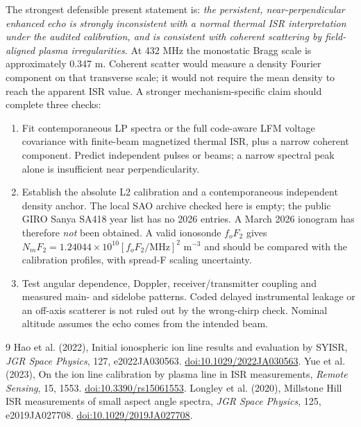 \documentclass[11pt,a4paper]{article}
\begin{document}
The strongest defensible present statement is: \emph{the persistent,
near-perpendicular enhanced echo is strongly inconsistent with a normal
thermal ISR interpretation under the audited calibration, and is consistent
with coherent scattering by field-aligned plasma irregularities.}
At 432 MHz the monostatic Bragg scale is approximately 0.347 m. Coherent
scatter would measure a density Fourier component on that transverse scale;
it would not require the mean density to reach the apparent ISR value.
A stronger mechanism-specific claim should complete three checks:
\begin{enumerate}
\item Fit contemporaneous LP spectra or the full code-aware LFM voltage
covariance with finite-beam magnetized thermal ISR, plus a narrow coherent
component. Predict independent pulses or beams; a narrow spectral peak alone
is insufficient near perpendicularity.
\item Establish the absolute L2 calibration and a contemporaneous independent
density anchor. The local SAO archive checked here is empty; the public GIRO
Sanya SA418 year list has no 2026 entries. A March 2026 ionogram has therefore
\emph{not} been obtained. A valid ionosonde $f_oF_2$ gives
$N_mF_2=1.24044\times10^{10}[f_oF_2/\mathrm{MHz}]^2$ m$^{-3}$ and should be
compared with the calibration profiles, with spread-F scaling uncertainty.
\item Test angular dependence, Doppler, receiver/transmitter coupling and
measured main- and sidelobe patterns. Coded delayed instrumental leakage or
an off-axis scatterer is not ruled out by the wrong-chirp check. Nominal
altitude assumes the echo comes from the intended beam.
\end{enumerate}

\begin{thebibliography}{9}\small
{} Hao et al. (2022), Initial ionospheric ion line results and
evaluation by SYISR, \emph{JGR Space Physics}, 127, e2022JA030563.
\href{https://doi.org/10.1029/2022JA030563}{doi:10.1029/2022JA030563}.
 Yue et al. (2023), On the ion line calibration by plasma line
in ISR measurements, \emph{Remote Sensing}, 15, 1553.
\href{https://doi.org/10.3390/rs15061553}{doi:10.3390/rs15061553}.
 Longley et al. (2020), Millstone Hill ISR measurements
of small aspect angle spectra, \emph{JGR Space Physics}, 125, e2019JA027708.
\href{https://doi.org/10.1029/2019JA027708}{doi:10.1029/2019JA027708}.
\end{thebibliography}
\end{document}
